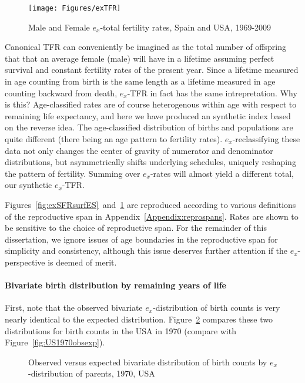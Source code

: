\begin{figure}[ht!]
        \centering  
          \caption{Male and Female $e_x$-total fertility rates, Spain
          and USA, 1969-2009}
           \texttt{[image: Figures/exTFR]}
          \label{fig:exTFR}
\end{figure}

Canonical TFR can conveniently be imagined as the total number of
offspring that that an average female (male) will have in a lifetime assuming
perfect survival and constant fertility rates of the present year.
Since a lifetime measured in age counting from birth is the same length as a
lifetime measured in age counting backward from death, $e_x$-TFR in fact has the
same intrepretation. Why is this? Age-classified rates are of course
heterogenous within age with respect to remaining life expectancy, and here we have produced
an synthetic index based on the reverse idea. The age-classified
distribution of births and populations are quite different (there being an age
pattern to fertility rates). $e_x$-reclassifying these data not only changes the
center of gravity of numerator and denominator distributions, but asymmetrically
shifts underlying schedules, uniquely reshaping the pattern of
fertility. Summing over $e_x$-rates will almost yield a different total, our
synthetic $e_x$-TFR. 

Figures~\ref{fig:exSFRsurfES}~and~\ref{fig:exTFR} are reproduced according to
various definitions of the reproductive span in
Appendix~\ref{Appendix:reprospans}. Rates are shown to be sensitive to the
choice of reproductive span. For the remainder of this dissertation, we ignore
issues of age boundaries in the reproductive span for simplicity and
consistency, although this issue deserves further attention if the
$e_x$-perspective is deemed of merit.

\paragraph{Bivariate birth distribution by remaining years of life}

First, note that the observed bivariate $e_x$-distribution of birth counts is
very nearly identical to the expected distribution.
Figure~\ref{fig:US1970obsexpex} compares these two distributions for birth
counts in the USA in 1970 (compare with Figure~\ref{fig:US1970obsexp}).

\begin{figure}[ht!]
        \centering  
          \caption{Observed versus expected bivariate
          distribution of birth counts by $e_x$-distribution of parents, 1970,
          USA}
          \label{fig:US1970obsexpex}
\end{figure}








